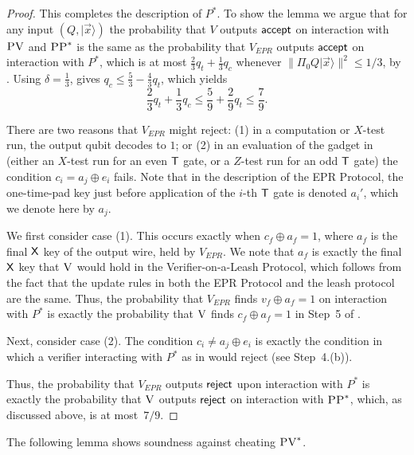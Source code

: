 \documentclass{toc}
\newcommand{\ket}[1]{|#1\rangle}
\newcommand{\ver}{\textsc{V}}
\newcommand{\pv}{\textsc{PV}}
\newcommand{\pp}{\textsc{PP}}
\begin{document}
\begin{proof}
This completes the description of $P^*$. To show the lemma we argue that for any input $(Q,\ket{\vec{x}})$ the probability that $V$ outputs $\sf accept$ on interaction with $\pv$ and $\pp^*$ is the same as the probability that $V_{EPR}$ outputs $\sf accept$ on interaction with $P^*$, which is at most $\frac{2}{3}q_t+\frac{1}{3}q_c$ whenever $\|\Pi_0 Q \ket{\vec{x}}\|^2 \leq 1/3$, by . Using $\delta=\frac{1}{3}$,  gives $q_c\leq \frac{5}{3}-\frac{4}{3}q_t$, which yields
$$\frac{2}{3}q_t+\frac{1}{3}q_c\leq \frac{5}{9}+\frac{2}{9}q_t\leq \frac{7}{9}.$$


There are two reasons that $V_{EPR}$ might reject: (1) in a computation or $X$-test run, the output qubit decodes to $1$; or (2) in an evaluation of the gadget in  (either an $X$-test run for an even $\sf T$ gate, or a $Z$-test run for an odd $\sf T$ gate) the condition ${c}_i=a_j\oplus e_i$ fails. Note that in the description of the EPR Protocol, the one-time-pad key just before application of the $i$-th $\sf T$ gate is denoted $a_i'$, which we denote here by $a_j$. 

We first consider case (1). This occurs exactly when ${c_f}\oplus a_f=1$, where $a_f$ is the final $\sf X$ key of the output wire, held by $V_{EPR}$. We note that $a_f$ is exactly the final $\sf X$ key that $\ver$ would hold in the Verifier-on-a-Leash Protocol, which follows from the fact that the update rules in both the EPR Protocol and the leash protocol are the same. Thus, the probability that $V_{EPR}$ finds ${v_f}\oplus a_f=1$ on interaction with $P^*$ is exactly the probability that $\ver$ finds $c_f\oplus a_f=1$ in Step~5 of . 

Next, consider case (2). The condition ${c}_i\neq a_{j}\oplus e_i$ is exactly
 the condition in which a verifier interacting with $P^*$ as in  would reject (see Step~4.(b)).

Thus, the probability that $V_{EPR}$ outputs $\sf reject$ upon interaction with $P^*$ is exactly the probability that $\ver$ outputs $\sf reject$ on interaction with $\pp^*$, which, as discussed above, is at most~$7/9$. %
\end{proof}





\noindent The following lemma shows soundness against cheating $\pv^*$.
\end{document}
